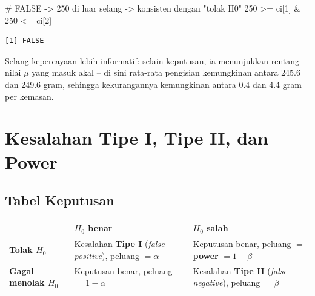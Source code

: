 \documentclass[
  indonesian,
  letterpaper,
]{book}
\newenvironment{Shaded}{\begin{snugshade}}{\end{snugshade}}
\newcommand{\CommentTok}[1]{\textcolor[rgb]{0.37,0.37,0.37}{#1}}
\newcommand{\DecValTok}[1]{\textcolor[rgb]{0.68,0.00,0.00}{#1}}
\newcommand{\NormalTok}[1]{\textcolor[rgb]{0.00,0.23,0.31}{#1}}
\newcommand{\SpecialCharTok}[1]{\textcolor[rgb]{0.37,0.37,0.37}{#1}}
\newcounter{none} %
\begin{document}
\begin{Shaded}
\begin{Highlighting}[]
\CommentTok{\# FALSE {-}\textgreater{} 250 di luar selang {-}\textgreater{} konsisten dengan "tolak H0"}
\DecValTok{250} \SpecialCharTok{\textgreater{}=}\NormalTok{ ci[}\DecValTok{1}\NormalTok{] }\SpecialCharTok{\&} \DecValTok{250} \SpecialCharTok{\textless{}=}\NormalTok{ ci[}\DecValTok{2}\NormalTok{]}
\end{Highlighting}
\end{Shaded}

\begin{verbatim}
[1] FALSE
\end{verbatim}

Selang kepercayaan lebih informatif: selain keputusan, ia menunjukkan
rentang nilai \(\mu\) yang masuk akal -- di sini rata-rata pengisian
kemungkinan antara 245.6 dan 249.6 gram, sehingga kekurangannya
kemungkinan antara 0.4 dan 4.4 gram per kemasan.


\chapter{Kesalahan Tipe I, Tipe II, dan
Power}\label{kesalahan-tipe-i-tipe-ii-dan-power}

\section{Tabel Keputusan}\label{tabel-keputusan}

{\def\LTcaptype{none} %
\begin{longtable}[]{@{}
  >{\raggedright\arraybackslash}p{}
  >{\raggedright\arraybackslash}p{}
  >{\raggedright\arraybackslash}p{}@{}}
\toprule\noalign{}
\begin{minipage}[b]{\linewidth}\raggedright
\end{minipage} & \begin{minipage}[b]{\linewidth}\raggedright
\(H_0\) benar
\end{minipage} & \begin{minipage}[b]{\linewidth}\raggedright
\(H_0\) salah
\end{minipage} \\
\midrule\noalign{}
\endhead
\bottomrule\noalign{}
\endlastfoot
\textbf{Tolak \(H_0\)} & Kesalahan \textbf{Tipe I} (\emph{false
positive}), peluang \(= \alpha\) & Keputusan benar, peluang \(=\)
\textbf{power} \(= 1 - \beta\) \\
\textbf{Gagal menolak \(H_0\)} & Keputusan benar, peluang
\(= 1 - \alpha\) & Kesalahan \textbf{Tipe II} (\emph{false negative}),
peluang \(= \beta\) \\
\end{longtable}
}
\end{document}
